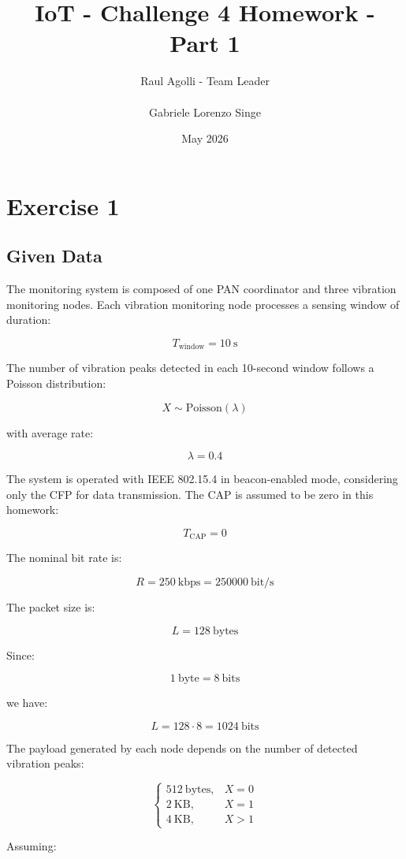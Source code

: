 \documentclass[a4paper,12pt]{article}
\title{IoT - Challenge 4 Homework - Part 1}
\author{Raul Agolli - Team Leader \\\\ Gabriele Lorenzo Singe}
\date{May 2026}
\begin{document}
\maketitle

\section{Exercise 1}

\subsection{Given Data}

The monitoring system is composed of one PAN coordinator and three vibration monitoring nodes.
Each vibration monitoring node processes a sensing window of duration:

\[
T_{\text{window}} = 10 \ \text{s}
\]

The number of vibration peaks detected in each 10-second window follows a Poisson distribution:

\[
X \sim \text{Poisson}(\lambda)
\]

with average rate:

\[
\lambda = 0.4
\]

The system is operated with IEEE 802.15.4 in beacon-enabled mode, considering only the CFP for data transmission.
The CAP is assumed to be zero in this homework:

\[
T_{\text{CAP}} = 0
\]



The nominal bit rate is:

\[
R = 250 \ \text{kbps} = 250000 \ \text{bit/s}
\]

The packet size is:

\[
L = 128 \ \text{bytes}
\]

Since:

\[
1 \ \text{byte} = 8 \ \text{bits}
\]

we have:

\[
L = 128 \cdot 8 = 1024 \ \text{bits}
\]

The payload generated by each node depends on the number of detected vibration peaks:

\[
\begin{cases}
512 \ \text{bytes}, & X=0 \\
2 \ \text{KB}, & X=1 \\
4 \ \text{KB}, & X>1
\end{cases}
\]

Assuming:
\end{document}
